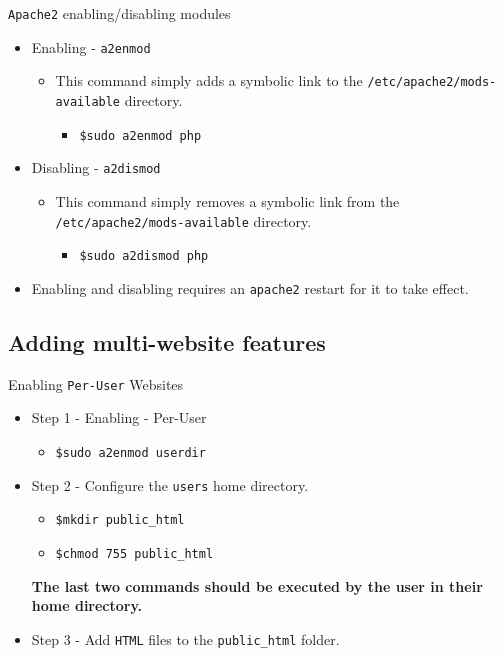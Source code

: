 \documentclass[xcolor=table,aspectratio=169]{beamer}
\begin{document}
\begin{frame}{\texttt{Apache2} enabling/disabling modules}
  \begin{itemize}
    \item Enabling - \texttt{a2enmod}
      \begin{itemize}
        \item This command simply adds a symbolic link to the \texttt{/etc/apache2/mods-available} directory.
          \begin{itemize}
            \item \texttt{\$sudo a2enmod php}
          \end{itemize}
        \end{itemize}
    \item Disabling - \texttt{a2dismod}
        \begin{itemize}
          \item This command simply removes a symbolic link from the \texttt{/etc/apache2/mods-available} directory.
            \begin{itemize}
              \item \texttt{\$sudo a2dismod php}
            \end{itemize}
          \end{itemize}
    \item Enabling and disabling requires an \texttt{apache2} restart for it to take effect.
  \end{itemize}
\end{frame}

\subsection{Adding multi-website features}
\begin{frame}{Enabling \texttt{Per-User} Websites}
   \begin{itemize}
      \item Step 1 - Enabling - Per-User
        \begin{itemize}
          \item \texttt{\$sudo a2enmod userdir}
        \end{itemize}
      \item  Step 2 - Configure the \texttt{users} home directory.
        \begin{itemize}
          \item \texttt{\$mkdir public\_html} 
          \item \texttt{\$chmod 755 public\_html}
        \end{itemize}
        \begin{tcolorbox}
          \begin{center}
            \scriptsize \textbf{The last two commands should be executed by the user in their home directory.}
          \end{center}
        \end{tcolorbox}
      \item  Step 3 - Add \texttt{HTML} files to the \texttt{public\_html} folder.
    \end{itemize}
\end{frame}
\end{document}
